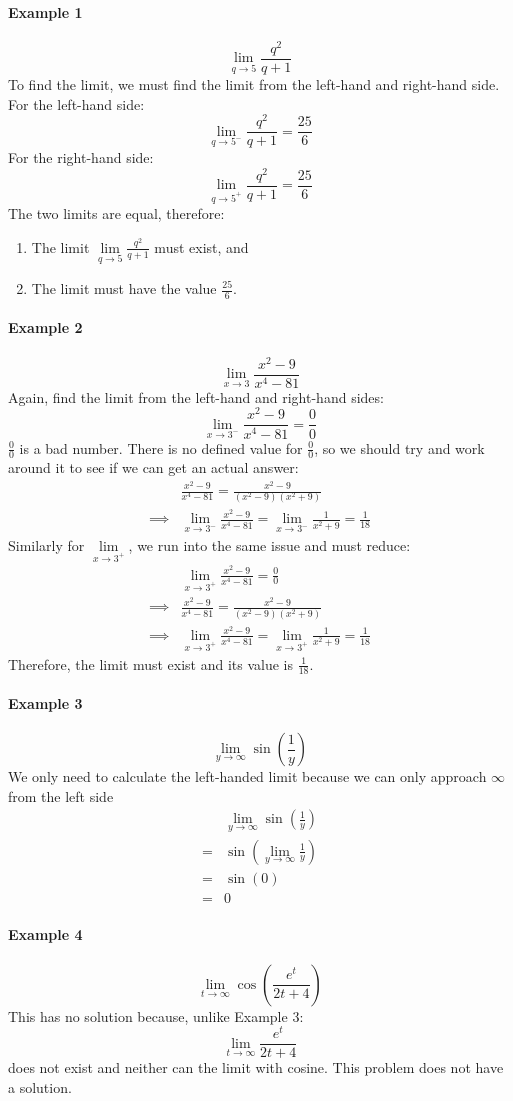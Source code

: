 \documentclass[../revisedMain.tex]{subfiles}
\begin{document}
\paragraph{Example 1} \[\lim\limits_{q\to 5} \frac{q^2}{q+1}\] To find the limit, we must find the limit from the left-hand and right-hand side. For the left-hand side: \[\lim\limits_{q\to 5^-} \frac{q^2}{q+1}=\frac{25}{6}\] For the right-hand side: 
\[\lim\limits_{q\to 5^+} \frac{q^2}{q+1}=\frac{25}{6}\] The two limits are equal, therefore:
\begin{enumerate}\item The limit \(\lim\limits_{q\to 5} \displaystyle\frac{q^2}{q+1}\) must exist, and\item The limit must have the value \(\displaystyle\frac{25}{6}\).\end{enumerate}
\paragraph{Example 2} \[\lim\limits_{x\to 3}\frac{x^2-9}{x^4-81}\] Again, find the limit from the left-hand and right-hand sides: \[\lim\limits_{x\to 3^-}\frac{x^2-9}{x^4-81}=\frac{0}{0}\] \(\displaystyle\frac{0}{0}\) is a bad number. There is no defined value for \(\displaystyle\frac{0}{0}\), so we should try and work around it to see if we can get an actual answer: 
\begin{equation}\begin{split}&\frac{x^2-9}{x^4-81}=\frac{x^2-9}{(x^2-9)(x^2+9)}\\\implies&\lim\limits_{x\to 3^-}\frac{x^2-9}{x^4-81}=\lim_{x\to 3^-}\frac{1}{x^2+9}=\frac{1}{18}\end{split}\end{equation}
Similarly for \(\lim\limits_{x\to 3^+}\), we run into the same issue and must reduce:
\begin{equation}\begin{split}&\lim\limits_{x\to 3^+}\frac{x^2-9}{x^4-81}=\frac{0}{0}\\\implies&\frac{x^2-9}{x^4-81}=\frac{x^2-9}{(x^2-9)(x^2+9)}\\\implies&\lim\limits_{x\to 3^+}\frac{x^2-9}{x^4-81}=\lim_{x\to 3^+}\frac{1}{x^2+9}=\frac{1}{18}\end{split}
\end{equation} Therefore, the limit must exist and its value is \(\displaystyle\frac{1}{18}\).
\paragraph{Example 3} \[\lim_{y\to\infty}\sin\left(\frac{1}{y}\right)\] We only need to calculate the left-handed limit because we can only approach \(\infty\) from the left side 
\begin{equation}\begin{split}&\lim_{y\to\infty}\sin\left(\frac{1}{y}\right)\\=&\sin\left(\lim_{y\to\infty}\frac{1}{y}\right)\\=&\sin(0)\\=&0\end{split}\end{equation}
\paragraph{Example 4} \[\lim_{t\to\infty}\cos\left(\frac{e^t}{2t+4}\right)\] This has no solution because, unlike Example 3: \[\lim_{t\to\infty}\frac{e^t}{2t+4}\] does not exist and neither can the limit with cosine. This problem does not have a solution.\\
\end{document}
